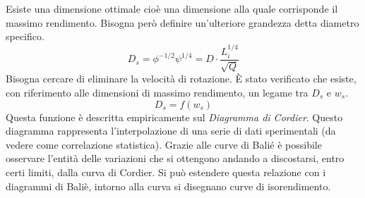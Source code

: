 Esiste una dimensione ottimale cioè una dimensione alla quale corrisponde il massimo rendimento. Bisogna però definire un’ulteriore grandezza detta diametro specifico.
\begin{equation}
D_s= \phi^{-1/2} \psi^{1/4} = D \cdot \frac{L_i^{1/4}}{\sqrt{Q}}
\end{equation}
Bisogna cercare di eliminare la velocità di rotazione. È stato verificato che esiste, con riferimento alle dimensioni di massimo rendimento, un legame tra $D_s$ e $w_s$. 
\begin{equation}
D_s=f(w_s)
\end{equation}
Questa funzione è descritta empiricamente sul \textit{Diagramma di Cordier}. Questo diagramma rappresenta l’interpolazione di una serie di dati sperimentali (da vedere come correlazione statistica).
Grazie alle curve di Balié è possibile osservare l’entità delle variazioni che si ottengono andando a discostarsi, entro certi limiti, dalla curva di Cordier.
Si può estendere questa relazione con i diagrammi di Baliè, intorno alla curva si disegnano curve di isorendimento.
